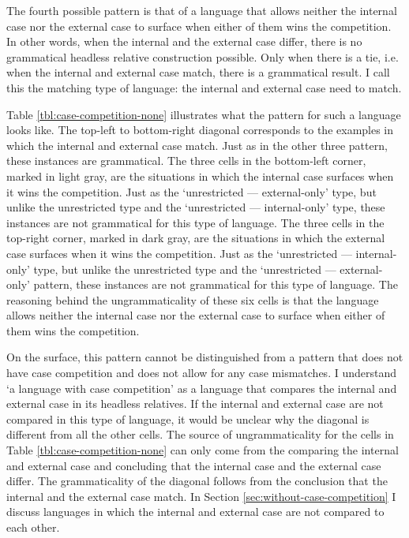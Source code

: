 The fourth possible pattern is that of a language that allows neither the internal case nor the external case to surface when either of them wins the competition. In other words, when the internal and the external case differ, there is no grammatical headless relative construction possible. Only when there is a tie, i.e. when the internal and external case match, there is a grammatical result. I call this the matching type of language: the internal and external case need to match.

Table \ref{tbl:case-competition-none} illustrates what the pattern for such a language looks like.
The top-left to bottom-right diagonal corresponds to the examples in which the internal and external case match. Just as in the other three pattern, these instances are grammatical.
The three cells in the bottom-left corner, marked in light gray, are the situations in which the internal case surfaces when it wins the competition. Just as the `unrestricted --- external-only' type, but unlike the unrestricted type and the `unrestricted --- internal-only' type, these instances are not grammatical for this type of language.
The three cells in the top-right corner, marked in dark gray, are the situations in which the external case surfaces when it wins the competition. Just as the `unrestricted --- internal-only' type, but unlike the unrestricted type and the `unrestricted --- external-only' pattern, these instances are not grammatical for this type of language. The reasoning behind the ungrammaticality of these six cells is that the language allows neither the internal case nor the external case to surface when either of them wins the competition.

On the surface, this pattern cannot be distinguished from a pattern that does not have case competition and does not allow for any case mismatches. I understand `a language with case competition' as a language that compares the internal and external case in its headless relatives. If the internal and external case are not compared in this type of language, it would be unclear why the diagonal is different from all the other cells. The source of ungrammaticality for the cells in Table \ref{tbl:case-competition-none} can only come from the comparing the internal and external case and concluding that the internal case and the external case differ. The grammaticality of the diagonal follows from the conclusion that the internal and the external case match. In Section \ref{sec:without-case-competition} I discuss languages in which the internal and external case are not compared to each other.

